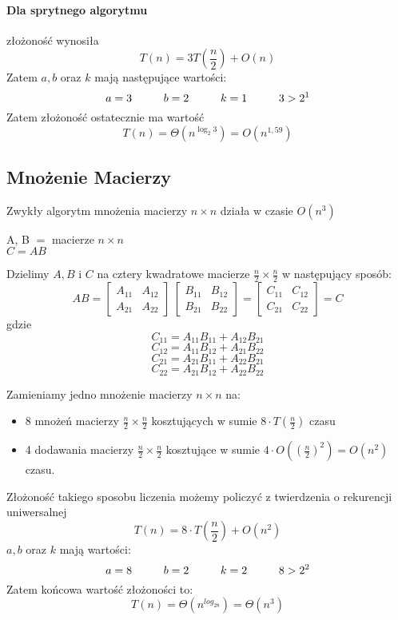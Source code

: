 \paragraph{Dla sprytnego algorytmu} złożoność wynosiła
	$$T(n) = 3T(\frac{n}{2})+O(n)$$
Zatem $a,b$ oraz $k$ mają następujące wartości:
	$$a=3 \hspace*{1cm} b=2 \hspace*{1cm} k=1 \hspace*{1cm} 3>2^1$$
Zatem złożoność ostatecznie ma wartość
	$$T(n)= \Theta(n^{\log_2 3}) = O(n^{1,59})$$

\subsection{Mnożenie Macierzy}
Zwykły algorytm mnożenia macierzy $n \times n$ działa w czasie $O(n^3)$

A, B $=$ macierze $n \times n$\\
$C = AB$ 

Dzielimy $A,B$ i $C$ na cztery kwadratowe macierze $\frac{n}{2} \times \frac{n}{2}$ w następujący sposób:
\[
AB = 
\begin{bmatrix}
    A_{11}	& A_{12} \\
    A_{21}  & A_{22} 
\end{bmatrix}\ 
\begin{bmatrix}
    B_{11}  & B_{12} \\
    B_{21}  & B_{22} 
\end{bmatrix}
=
\begin{bmatrix}
    C_{11}  & C_{12} \\
    C_{21}  & C_{22} 
\end{bmatrix} = C
\]
gdzie 
$$C_{11}= A_{11}B_{11}+A_{12}B_{21}$$
$$C_{12}= A_{11}B_{12}+A_{21}B_{22}$$
$$C_{21}= A_{21}B_{11}+A_{22}B_{21}$$
$$C_{22}= A_{21}B_{12}+A_{22}B_{22}$$

Zamieniamy jedno mnożenie macierzy $n \times n$ na:
\begin{itemize}
	\item 8 mnożeń macierzy $\frac{n}{2} \times \frac{n}{2}$ kosztujących w sumie $8 \cdot T(\frac{n}{2})$ czasu 
	\item 4 dodawania macierzy  $\frac{n}{2} \times \frac{n}{2}$ kosztujące w sumie $4 \cdot O((\frac{n}{2})^2) = O(n^2)$ czasu.
\end{itemize} 
Złożoność takiego sposobu liczenia możemy policzyć z twierdzenia o  rekurencji uniwersalnej
$$T(n)=8 \cdot T( \frac{n}{2} )+ O(n^2)$$
$a,b$ oraz $k$ mają wartości:
$$a=8 \hspace*{1cm} b=2 \hspace*{1cm} k=2 \hspace*{1cm} 8>2^2$$
Zatem końcowa wartość złożoności to:
$$T(n)=\Theta(n^{log_28}) = \Theta(n^3)$$

